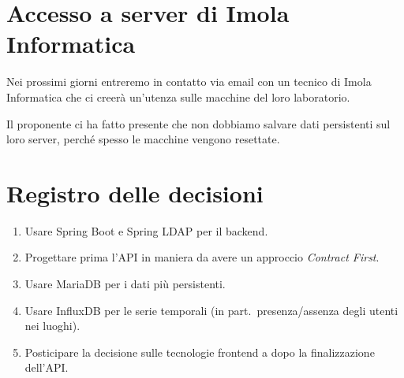 \documentclass{article}
\begin{document}


\section{Accesso a server di Imola Informatica}%
\label{sec:accesso_a_server_di_imola_informatica}

Nei prossimi giorni entreremo in contatto via email con un tecnico di Imola Informatica che ci creerà un'utenza sulle macchine del loro laboratorio.

Il proponente ci ha fatto presente che non dobbiamo salvare dati persistenti sul loro server, perché spesso le macchine vengono resettate.


\newpage
\section{Registro delle decisioni}%
\label{sec:registro_delle_decisioni}

\begin{enumerate}
  \item Usare Spring Boot e Spring LDAP per il backend.
  \item Progettare prima l'API in maniera da avere un approccio \textit{Contract First}.
  \item Usare MariaDB per i dati più persistenti.
  \item Usare InfluxDB per le serie temporali (in part.\ presenza/assenza degli utenti nei luoghi).
  \item Posticipare la decisione sulle tecnologie frontend a dopo la finalizzazione dell'API\@.
\end{enumerate}
\end{document}
